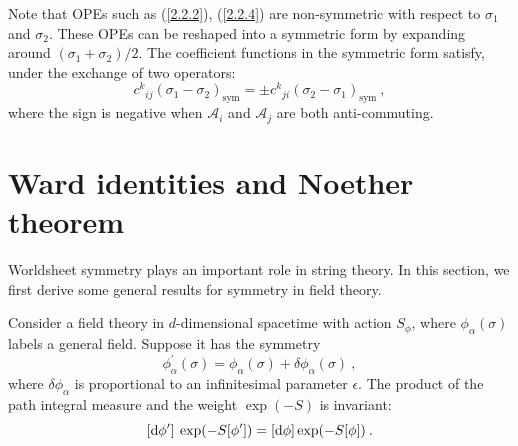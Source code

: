 Note that OPEs such as (\ref{2.2.2}), (\ref{2.2.4}) are non-symmetric with respect to $\sigma_{1}$ and $\sigma_{2}$. These OPEs can be reshaped into a symmetric form by expanding around $(\sigma_{1}+\sigma_{2})/ 2$.    
The coefficient functions in the symmetric form satisfy, under the exchange of two operators:    
\begin{equation}
	c^{k}{}_{ij}(\sigma_{1}-\sigma_{2})_{\mathrm{sym}}= \pm c^{k}{}_{j i}(\sigma_{2}-\sigma_{1})_{\mathrm{sym}} \:,
\end{equation}
where the sign is negative when $\mathscr{A}_{i}$ and $\mathscr{A}_{j}$ are both anti-commuting.    


\section{\texorpdfstring{Ward identities and Noether theorem}{2.3 Ward identities and Noether theorem}}

Worldsheet symmetry plays an important role in string theory.    
In this section, we first derive some general results for symmetry in field theory.    

Consider a field theory in $d$-dimensional spacetime with action $S_\phi$, where $\phi_\alpha(\sigma)$ labels a general field. Suppose it has the symmetry    
\begin{equation} \label{2.3.1}
	\phi_{\alpha}^{\prime}(\sigma)=\phi_{\alpha}(\sigma)+\delta \phi_{\alpha}(\sigma) \:,
\end{equation}
where $\delta \phi_\alpha$ is proportional to an infinitesimal parameter $\epsilon$. The product of the path integral measure and the weight $\exp(-S)$ is invariant:    
\begin{equation} \label{2.3.2}
	[\mathrm{d} \phi^{\prime}]\: \exp(-S[\phi^{\prime}])=[\mathrm{d}  \phi] \exp (-S[\phi]) \:.
\end{equation}

